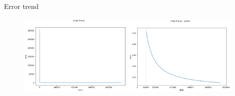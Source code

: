 \documentclass[10pt, aspectratio=169, compress, protectframetitle, handout]{beamer}
\begin{document}
\begin{frame}{Error trend}

    \begin{figure}
        \centering
        \includegraphics[width=0.49\textwidth,valign=b]{figures/Errors.png}
        \includegraphics[width=0.49\textwidth,valign=b]{figures/Errors_zoom.png}
        \label{fig:errors}
    \end{figure}
    
\end{frame}
\end{document}
